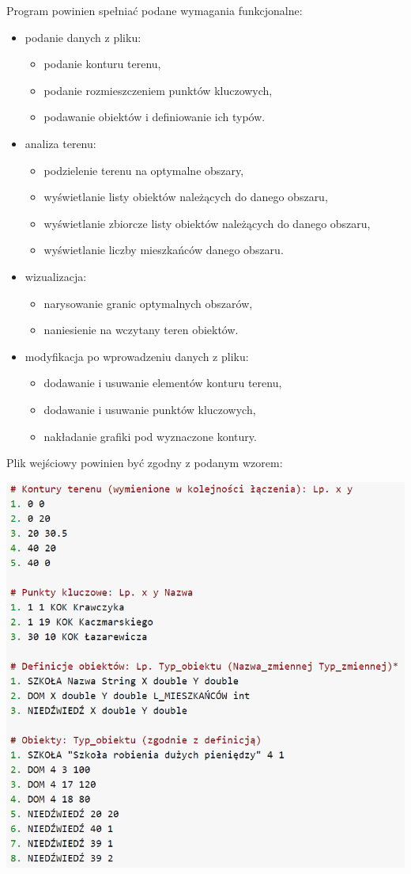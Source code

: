 \documentclass[a4paper,11pt]{article}
\begin{document}
Program powinien spełniać podane wymagania funkcjonalne:
\begin{itemize}
\item podanie danych z pliku:
\begin{itemize}
\item podanie konturu terenu,
\item podanie rozmieszczeniem punktów kluczowych,
\item podawanie obiektów i definiowanie ich typów.
\end{itemize}
\item analiza terenu:
\begin{itemize}
\item podzielenie terenu na optymalne obszary,
\item wyświetlanie listy obiektów należących do danego obszaru,
\item wyświetlanie zbiorcze listy obiektów należących do danego obszaru,
\item wyświetlanie liczby mieszkańców danego obszaru.
\end{itemize}
\item wizualizacja:
\begin{itemize}
\item narysowanie granic optymalnych obszarów,
\item naniesienie na wczytany teren obiektów.
\end{itemize}
\item modyfikacja po wprowadzeniu danych z pliku:
\begin{itemize}
\item dodawanie i usuwanie elementów konturu terenu,
\item dodawanie i usuwanie punktów kluczowych,
\item nakładanie grafiki pod wyznaczone kontury.
\end{itemize}
\end{itemize}

Plik wejściowy powinien być zgodny z podanym wzorem:

\includegraphics[scale=0.70]{ExampleInputFile}
\end{document}
